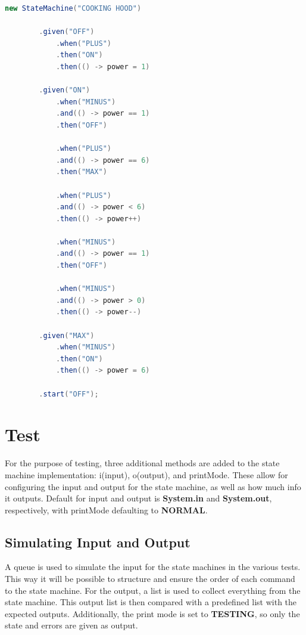 \documentclass{article}
\begin{document}
\begin{lstlisting}[language=java, caption={Cooking Hood Implmentation}, captionpos=b]
    new StateMachine("COOKING HOOD")

        .given("OFF")
            .when("PLUS")
            .then("ON")
            .then(() -> power = 1)

        .given("ON")
            .when("MINUS")
            .and(() -> power == 1)
            .then("OFF")

            .when("PLUS")
            .and(() -> power == 6)
            .then("MAX")

            .when("PLUS")
            .and(() -> power < 6)
            .then(() -> power++)

            .when("MINUS")
            .and(() -> power == 1)
            .then("OFF")

            .when("MINUS")
            .and(() -> power > 0)
            .then(() -> power--)

        .given("MAX")
            .when("MINUS")
            .then("ON")
            .then(() -> power = 6)
        
        .start("OFF");
\end{lstlisting}

\section{Test}

For the purpose of testing, three additional methods are added to the state machine implementation: i(input), o(output), and printMode. These allow for configuring the input and output for the state machine, as well as how much info it outputs. Default for input and output is \textbf{System.in} and \textbf{System.out}, respectively, with printMode defaulting to \textbf{NORMAL}.

\subsection{Simulating Input and Output}

A queue is used to simulate the input for the state machines in the various tests. This way it will be possible to structure and ensure the order of each command to the state machine. For the output, a list is used to collect everything from the state machine. This output list is then compared with a predefined list with the expected outputs. Additionally, the print mode is set to \textbf{TESTING}, so only the state and errors are given as output.
\end{document}
